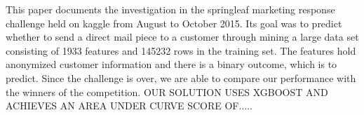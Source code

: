This paper documents the investigation in the springleaf marketing response challenge held on kaggle from August to October 2015. Its goal was to predict whether to send a direct mail piece to a customer through mining a large data set consisting of 1933 features and 145232 rows in the training set. The features hold anonymized customer information and there is a binary outcome, which is to predict. Since the challenge is over, we are able to compare our performance with the winners of the competition. OUR SOLUTION USES XGBOOST AND ACHIEVES AN AREA UNDER CURVE SCORE OF.....